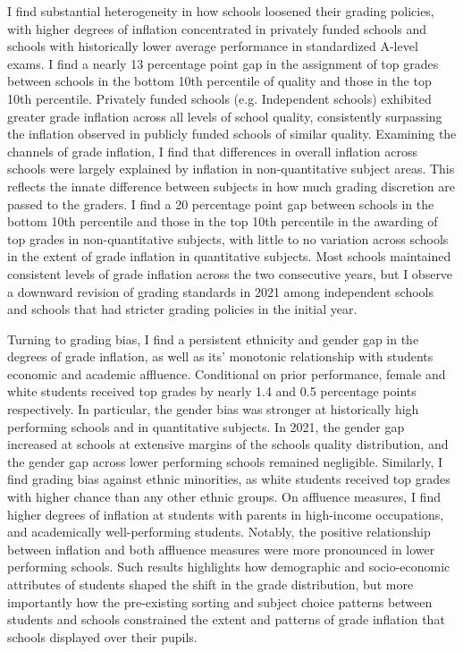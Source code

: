 I find substantial heterogeneity in how schools loosened their grading policies, with higher degrees of inflation concentrated in privately funded schools and schools with historically lower average performance in standardized A-level exams. I find a nearly 13 percentage point gap in the assignment of top grades between schools in the bottom 10th percentile of quality and those in the top 10th percentile. Privately funded schools (e.g. Independent schools) exhibited greater grade inflation across all levels of school quality, consistently surpassing the inflation observed in publicly funded schools of similar quality. Examining the channels of grade inflation, I find that differences in overall inflation across schools were largely explained by inflation in non-quantitative subject areas. This reflects the innate difference between subjects in how much grading discretion are passed to the graders. I find a 20 percentage point gap between schools in the bottom 10th percentile and those in the top 10th percentile in the awarding of top grades in non-quantitative subjects, with little to no variation across schools in the extent of grade inflation in quantitative subjects. Most schools maintained consistent levels of grade inflation across the two consecutive years, but I observe a downward revision of grading standards in 2021 among independent schools and schools that had stricter grading policies in the initial year.

Turning to grading bias, I find a persistent ethnicity and gender gap in the degrees of grade inflation, as well as its' monotonic relationship with students economic and academic affluence. Conditional on prior performance, female and white students received top grades by nearly 1.4 and 0.5 percentage points respectively. In particular, the gender bias was stronger at historically high performing schools and in quantitative subjects. In 2021, the gender gap increased at schools at extensive margins of the schools quality distribution, and the gender gap across lower performing schools remained negligible. Similarly, I find grading bias against ethnic minorities, as white students received top grades with higher chance than any other ethnic groups. On affluence measures, I find higher degrees of inflation at students with parents in high-income occupations, and academically well-performing students. Notably, the positive relationship between inflation and both affluence measures were more pronounced in lower performing schools. Such results highlights how demographic and socio-economic attributes of students shaped the shift in the grade distribution, but more importantly how the pre-existing sorting and subject choice patterns between students and schools constrained the extent and patterns of grade inflation that schools displayed over their pupils. 

